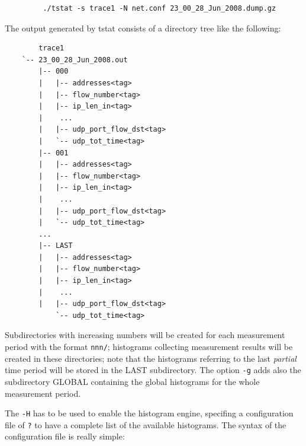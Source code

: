 \documentclass[11pt]{article}
\begin{document}
\begin{small}\begin{verbatim}
         ./tstat -s trace1 -N net.conf 23_00_28_Jun_2008.dump.gz
\end{verbatim}\end{small} \noindent
The output generated by tstat consists of a directory tree like the following:

\begin{small}\begin{verbatim}
        trace1
    `-- 23_00_28_Jun_2008.out
        |-- 000
        |   |-- addresses<tag>
        |   |-- flow_number<tag>
        |   |-- ip_len_in<tag>
        |    ...
        |   |-- udp_port_flow_dst<tag>
        |   `-- udp_tot_time<tag>
        |-- 001
        |   |-- addresses<tag>
        |   |-- flow_number<tag>
        |   |-- ip_len_in<tag>
        |    ...
        |   |-- udp_port_flow_dst<tag>
        |   `-- udp_tot_time<tag>
        ...
        |-- LAST
        |   |-- addresses<tag>
        |   |-- flow_number<tag>
        |   |-- ip_len_in<tag>
        |    ...
        |   |-- udp_port_flow_dst<tag>
            `-- udp_tot_time<tag>
\end{verbatim}\end{small} \noindent
Subdirectories with increasing numbers will be created for each measurement
period with the format \texttt{nnn/}; histograms collecting measurement results will
be created in these directories; note that the histograms referring to the last
\textit{partial} time period will be stored in the LAST subdirectory. The option \texttt{-g}
adds also the subdirectory GLOBAL containing the global histograms for the whole
measurement period.



The \texttt{-H} has to be used to enable the histogram engine, specifing a configuration
file of \texttt{?} to have a complete list of the available histograms. The syntax of
the configuration file is really simple:
\end{document}
